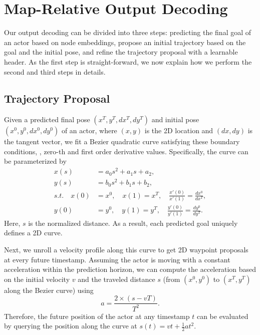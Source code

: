 


\section{Map-Relative Output Decoding}
\label{sec:supp_output}
Our output decoding can be divided into three steps: predicting the final goal
of an actor based on node embeddings, propose an initial trajectory based on the
goal and the initial pose, and refine the trajectory proposal with a learnable
header. As the first step is straight-forward, we now explain how we perform the
second and third steps in details.

\subsection{Trajectory Proposal}
Given a predicted final pose $\left(x^T, y^T, dx^T, dy^T\right)$ and initial
pose $\left(x^0,
y^0, dx^0, dy^0\right)$ of an actor, where $(x, y)$ is the 2D location and $(dx, dy)$
is the tangent vector, we fit a Bezier quadratic curve satisfying these boundary
conditions, \ie, zero-th and first order derivative values. Specifically, the curve can be parameterized by 
\begin{align}
  \nonumber
  x(s) &= a_0 s^2 + a_1 s + a_2,
  \\
  \nonumber
  y(s) &= b_0 s^2 + b_1 s + b_2,
  \\
  \nonumber
  s.t. \quad x(0) &= x^0, \quad x(1) = x^T, \quad \frac{x'(0)}{x'(1)} = \frac{dx^0}{dx^T},
  \\
  \nonumber
  y(0) &= y^0, \quad y(1) = y^T,  \quad \frac{y'(0)}{y'(1)} =
  \frac{dy^0}{dy^T}.
\end{align}
Here, $s$ is the normalized distance.
As a result, each predicted goal uniquely defines a 2D curve.

Next, we unroll a velocity profile along this curve to get 2D waypoint proposals
at every future timestamp. Assuming the actor is moving with a constant
acceleration within the prediction horizon, we can compute the acceleration
based on the initial velocity $v$ and the traveled distance $s$ (from
$(x^0, y^0)$ to $(x^T, y^T)$ along the Bezier curve) using
$$
a = \frac{2\times(s - vT)}{T^2}.
$$
Therefore, the future position of the actor at any timestamp $t$ can be
evaluated by querying the position along the curve at $s(t) = vt +
\frac{1}{2}at^2$.


